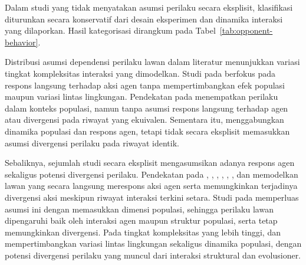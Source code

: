 Dalam studi yang tidak menyatakan asumsi perilaku secara eksplisit, 
klasifikasi diturunkan secara konservatif dari desain eksperimen dan dinamika 
interaksi yang dilaporkan. Hasil kategorisasi dirangkum pada 
Tabel~\ref{tab:opponent-behavior}.

Distribusi asumsi dependensi perilaku lawan dalam literatur menunjukkan variasi tingkat kompleksitas interaksi yang dimodelkan. Studi pada \cite{jin_achieving_2025} berfokus pada respons langsung terhadap aksi agen tanpa mempertimbangkan efek populasi maupun variasi lintas lingkungan. Pendekatan pada \cite{gomez_grounded_2025} menempatkan perilaku dalam konteks populasi, namun tanpa asumsi respons langsung terhadap agen atau divergensi pada riwayat yang ekuivalen. Sementara itu, \cite{elhamer_effects_2020} menggabungkan dinamika populasi dan respons agen, tetapi tidak secara eksplisit memasukkan asumsi divergensi perilaku pada riwayat identik.

Sebaliknya, sejumlah studi secara eksplisit mengasumsikan adanya respons agen sekaligus potensi divergensi perilaku. Pendekatan pada \cite{qiao_o2m_2024}, \cite{lv_inducing_2023}, \cite{li_exploiting_2025}, \cite{freire_modeling_2023}, \cite{hu_modeling_2023}, \cite{wang_achieving_2019}, dan \cite{de_weerd_higher-order_2022} memodelkan lawan yang secara langsung merespons aksi agen serta memungkinkan terjadinya divergensi aksi meskipun riwayat interaksi terkini setara. Studi pada \cite{perera_learning_2025} memperluas asumsi ini dengan memasukkan dimensi populasi, sehingga perilaku lawan dipengaruhi baik oleh interaksi agen maupun struktur populasi, serta tetap memungkinkan divergensi. Pada tingkat kompleksitas yang lebih tinggi, \cite{zhu_evolutionary_2025} dan \cite{di_coupling_2023} mempertimbangkan variasi lintas lingkungan sekaligus dinamika populasi, dengan potensi divergensi perilaku yang muncul dari interaksi struktural dan evolusioner.


